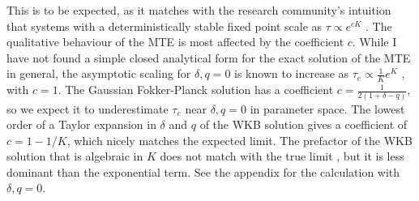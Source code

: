 This is to be expected, as it matches with the research community's intuition that systems with a deterministically stable fixed point scale as $\tau \propto e^{cK}$ \cite{Leigh1981,Lande1993,Kamenev2008,Cremer2009a,Dobrinevski2012,Yu2017}. 
The qualitative behaviour of the MTE is most affected by the coefficient $c$. %
While I have not found a simple closed analytical form for the exact solution of the MTE in general, the asymptotic scaling for $\delta,q = 0$ is known to increase as $\tau_e \propto \frac{1}{K}e^K$ \cite{Lande1993,Lambert2005}, with $c=1$. 
The Gaussian Fokker-Planck solution has a coefficient $c=\frac{1}{2(1+\delta-q)}$, so we expect it to underestimate $\tau_e$ near $\delta,q = 0$ in parameter space. %
The lowest order of a Taylor expansion in $\delta$ and $q$ of the WKB solution gives a coefficient of $c=1-1/K$, which nicely matches the expected limit. 
The prefactor of the WKB solution that is algebraic in $K$ does not match with the true limit \cite{Assaf2010,Badali2019a,Badali2019b}, but it is less dominant than the exponential term. %
See the appendix for the calculation with $\delta,q = 0$. 


